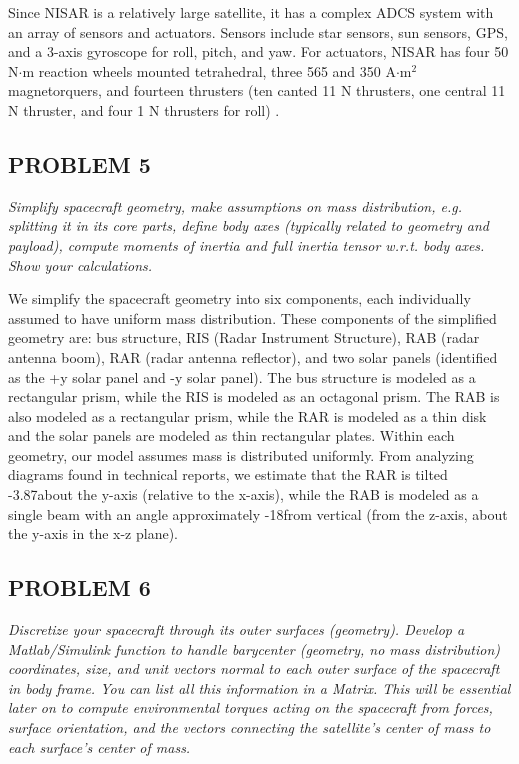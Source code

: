 Since NISAR is a relatively large satellite, it has a complex ADCS system with an array of sensors and actuators. Sensors include star sensors, sun sensors, GPS, and a 3-axis gyroscope for roll, pitch, and yaw. For actuators, NISAR has four 50 N$\cdot$m reaction wheels mounted tetrahedral, three 565 and 350 A$\cdot$m$^2$ magnetorquers, and fourteen thrusters (ten canted 11 N thrusters, one central 11 N thruster, and four 1 N thrusters for roll) \cite{NisarMission}.

\subsection{PROBLEM 5}
\textit{Simplify spacecraft geometry, make assumptions on mass distribution, e.g. splitting it in its core parts, define body axes (typically related to geometry and payload), compute moments of inertia and full inertia tensor w.r.t. body axes. Show your calculations.}

We simplify the spacecraft geometry into six components, each individually assumed to have uniform mass distribution. These components of the simplified geometry are: bus structure, RIS (Radar Instrument Structure), RAB (radar antenna boom), RAR (radar antenna reflector), and two solar panels (identified as the +y solar panel and -y solar panel). The bus structure is modeled as a rectangular prism, while the RIS is modeled as an octagonal prism. The RAB is also modeled as a rectangular prism, while the RAR is modeled as a thin disk and the solar panels are modeled as thin rectangular plates. Within each geometry, our model assumes mass is distributed uniformly. From analyzing diagrams found in technical reports, we estimate that the RAR is tilted -3.87\degree about the y-axis (relative to the x-axis), while the RAB is modeled as a single beam with an angle approximately -18\degree from vertical (from the z-axis, about the y-axis in the x-z plane).

\subsection{PROBLEM 6}
\textit{Discretize your spacecraft through its outer surfaces (geometry). Develop a Matlab/Simulink function to handle barycenter (geometry, no mass distribution) coordinates, size, and unit vectors normal to each outer surface of the spacecraft in body frame. You can list all this information in a Matrix. This will be essential later on to compute environmental torques acting on the spacecraft from forces, surface orientation, and the vectors connecting the satellite’s center of mass to each surface’s center of mass.}

